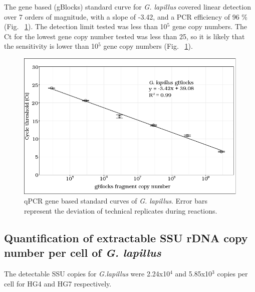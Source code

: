 \documentclass[10pt,letterpaper]{article}
\begin{document}
The gene based (gBlocks) standard curve for \emph{G. lapillus} covered linear detection over 7 orders of magnitude, with a slope of -3.42, and a PCR efficiency of 96 \% (Fig. ~\ref{fig:lapigblocks}). 
The detection limit tested was less than 10$^{5}$ gene copy numbers. 
The Ct for the lowest gene copy number tested was less than 25, so it is likely that the sensitivity is lower than 10$^{5}$ gene copy numbers (Fig. ~\ref{fig:lapigblocks}).\\
\begin{figure}
\includegraphics[scale=.8]{Hero_qpcr-figs/Fig3_gblocks-standards.png}
\caption{qPCR gene based standard curves of \emph{G. lapillus}. Error bars represent the deviation of technical replicates during reactions.}%
\label{fig:lapigblocks}
\end{figure}
\FloatBarrier

\FloatBarrier


\subsection*{Quantification of extractable SSU rDNA copy number per cell of \emph{G. lapillus}}
The detectable SSU copies for \emph{G.lapillus} were 2.24x10$^{4}$ and 5.85x10$^{3}$ copies per cell for HG4 and HG7 respectively. 
\end{document}
